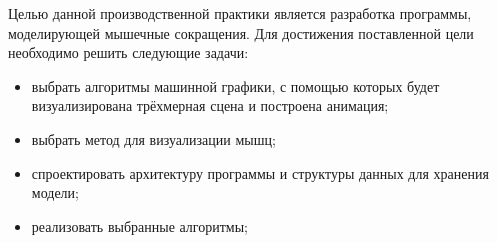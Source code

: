 \Introduction

Целью данной производственной практики является разработка программы, моделирующей мышечные сокращения. Для достижения поставленной цели необходимо решить следующие задачи:

\begin{itemize}
	\item выбрать алгоритмы машинной графики, с помощью которых будет визуализирована трёхмерная сцена и построена анимация;
	\item выбрать метод для визуализации мышц;
	\item спроектировать архитектуру программы и структуры данных для хранения модели;
	\item реализовать выбранные алгоритмы;
\end{itemize}